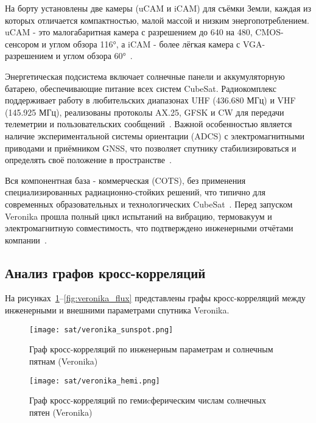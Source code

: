 На борту установлены две камеры (uCAM и iCAM) для съёмки Земли, каждая из
которых отличается компактностью, малой массой и низким энергопотреблением. uCAM
- это малогабаритная камера с разрешением до 640 на 480, CMOS-сенсором и углом
обзора 116°, а iCAM - более лёгкая камера с VGA-разрешением и углом обзора
60°~\cite{kozmonautika_veronika}.

Энергетическая подсистема включает солнечные панели и аккумуляторную батарею,
обеспечивающие питание всех систем CubeSat. Радиокомплекс поддерживает работу в
любительских диапазонах UHF (436.680 МГц) и VHF (145.925 МГц), реализованы
протоколы AX.25, GFSK и CW для передачи телеметрии и пользовательских
сообщений~\cite{spacemanic_veronika, nanosats_veronika, kozmonautika_veronika}.
Важной особенностью является наличие экспериментальной системы ориентации (ADCS)
с электромагнитными приводами и приёмником GNSS, что позволяет спутнику
стабилизироваться и определять своё положение в
пространстве~\cite{spacemanic_veronika, nanosats_veronika}.

Вся компонентная база - коммерческая (COTS), без применения специализированных
радиационно-стойких решений, что типично для современных образовательных и
технологических CubeSat~\cite{spacemanic_veronika, nanosats_veronika, nasa_soa}.
Перед запуском Veronika прошла полный цикл испытаний на вибрацию, термовакуум и
электромагнитную совместимость, что подтверждено инженерными отчётами
компании~\cite{spacemanic_veronika, kozmonautika_veronika}.

\subsection{Анализ графов кросс-корреляций}

На рисунках~\ref{fig:veronika_sunspot}--\ref{fig:veronika_flux} представлены
графы кросс-корреляций между инженерными и внешними параметрами спутника
Veronika.

\begin{figure}[H]
	\centering
	\texttt{[image: sat/veronika\_sunspot.png]}
	\caption{Граф кросс-корреляций по инженерным параметрам и солнечным пятнам (Veronika)}
	\label{fig:veronika_sunspot}
\end{figure}

\begin{figure}[H]
	\centering
	\texttt{[image: sat/veronika\_hemi.png]}
	\caption{Граф кросс-корреляций по гемиcферическим числам солнечных пятен (Veronika)}
	\label{fig:veronika_hemi}
\end{figure}

